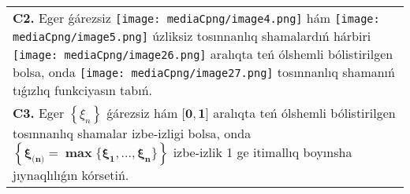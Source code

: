 \documentclass{article}
\begin{document}
\begin{tabular}{m{17cm}}
 \\
\textbf{C2.} Eger ǵárezsiz \texttt{[image: mediaCpng/image4.png]} hám \texttt{[image: mediaCpng/image5.png]} úzliksiz tosınnanlıq shamalardıń hárbiri \texttt{[image: mediaCpng/image26.png]} aralıqta teń ólshemli bólistirilgen bolsa, onda \texttt{[image: mediaCpng/image27.png]} tosınnanlıq shamanıń tıǵızlıq funkciyasın tabıń.
 \\
\textbf{C3.} Eger \(\left\{ \xi_{n} \right\}\) ǵárezsiz hám \(\mathbf{\lbrack 0,1\rbrack}\) aralıqta teń ólshemli bólistirilgen tosınnanlıq shamalar izbe-izligi bolsa, onda \(\left\{ \mathbf{\xi}_{\mathbf{(}\mathbf{n}\mathbf{)}}\mathbf{=}\mathbf{\max}\mathbf{\{}\mathbf{\xi}_{\mathbf{1}}\mathbf{,...,}\mathbf{\xi}_{\mathbf{n}}\mathbf{\}} \right\}\) izbe-izlik 1 ge itimallıq boyınsha jıynaqlılıǵın kórsetiń.
 \\

\end{tabular}
\vspace{1cm}
\end{document}
